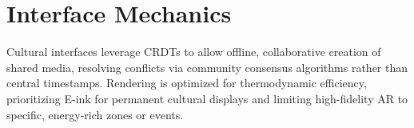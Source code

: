 \section{Interface Mechanics}
Cultural interfaces leverage CRDTs to allow offline, collaborative creation of shared media, resolving conflicts via community consensus algorithms rather than central timestamps. Rendering is optimized for thermodynamic efficiency, prioritizing E-ink for permanent cultural displays and limiting high-fidelity AR to specific, energy-rich zones or events.
